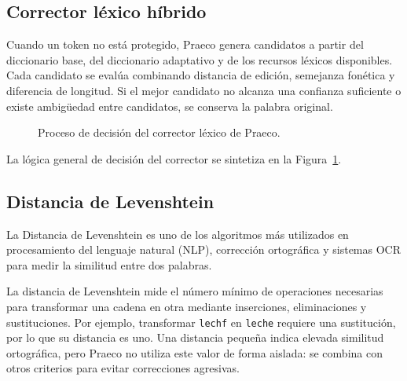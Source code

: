 \subsection{Corrector léxico híbrido}

Cuando un token no está protegido, Praeco genera candidatos a partir del diccionario base, del diccionario adaptativo y de los recursos léxicos disponibles. Cada candidato se evalúa combinando distancia de edición, semejanza fonética y diferencia de longitud. Si el mejor candidato no alcanza una confianza suficiente o existe ambigüedad entre candidatos, se conserva la palabra original.

\begin{figure}[htbp]
	\centering
	\caption{Proceso de decisión del corrector léxico de Praeco.}
	\label{fig:corrector-praeco}
\end{figure}

La lógica general de decisión del corrector se sintetiza en la Figura~\ref{fig:corrector-praeco}.

\subsection{Distancia de Levenshtein}

La Distancia de Levenshtein es uno de los algoritmos más utilizados en procesamiento del lenguaje natural (NLP), corrección ortográfica y sistemas OCR para medir la similitud entre dos palabras. 

La distancia de Levenshtein mide el número mínimo de operaciones necesarias para transformar una cadena en otra mediante inserciones, eliminaciones y sustituciones. Por ejemplo, transformar \texttt{lechf} en \texttt{leche} requiere una sustitución, por lo que su distancia es uno. Una distancia pequeña indica elevada similitud ortográfica, pero Praeco no utiliza este valor de forma aislada: se combina con otros criterios para evitar correcciones agresivas.

